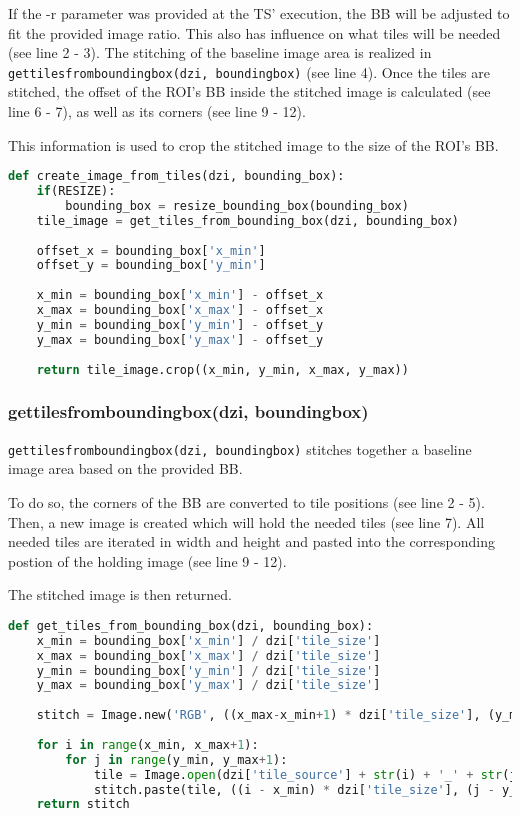 If the -r parameter was provided at the TS' execution, the BB will be adjusted to fit the provided image ratio. This also has influence on what tiles will be needed (see line 2 - 3). The stitching of the baseline image area is realized in \texttt{get{\textunderscore}tiles{\textunderscore}from{\textunderscore}bounding{\textunderscore}box(dzi, bounding{\textunderscore}box)} (see line 4). Once the tiles are stitched, the offset of the ROI's BB inside the stitched image is calculated (see line 6 - 7), as well as its corners (see line 9 - 12).

This information is used to crop the stitched image to the size of the ROI's BB.

\begin{lstlisting}[frame=single,language=python]
def create_image_from_tiles(dzi, bounding_box):
	if(RESIZE):
		bounding_box = resize_bounding_box(bounding_box)
	tile_image = get_tiles_from_bounding_box(dzi, bounding_box)
	
	offset_x = bounding_box['x_min']
	offset_y = bounding_box['y_min']
	
	x_min = bounding_box['x_min'] - offset_x
	x_max = bounding_box['x_max'] - offset_x
	y_min = bounding_box['y_min'] - offset_y
	y_max = bounding_box['y_max'] - offset_y
	
	return tile_image.crop((x_min, y_min, x_max, y_max))
\end{lstlisting}


\subsubsection{get{\textunderscore}tiles{\textunderscore}from{\textunderscore}bounding{\textunderscore}box(dzi, bounding{\textunderscore}box)}

\texttt{get{\textunderscore}tiles{\textunderscore}from{\textunderscore}bounding{\textunderscore}box(dzi, bounding{\textunderscore}box)} stitches together a baseline image area  based on the provided BB.

To do so, the corners of the BB are converted to tile positions (see line 2 - 5). Then, a new image is created which will hold the needed tiles (see line 7). All needed tiles are iterated in width and height and pasted into the corresponding postion of the holding image (see line 9 - 12).

The stitched image is then returned.

\begin{lstlisting}[frame=single,language=python]
def get_tiles_from_bounding_box(dzi, bounding_box):
	x_min = bounding_box['x_min'] / dzi['tile_size']
	x_max = bounding_box['x_max'] / dzi['tile_size']
	y_min = bounding_box['y_min'] / dzi['tile_size']
	y_max = bounding_box['y_max'] / dzi['tile_size']
	
	stitch = Image.new('RGB', ((x_max-x_min+1) * dzi['tile_size'], (y_max-y_min+1) * dzi['tile_size']))
	
	for i in range(x_min, x_max+1):
		for j in range(y_min, y_max+1):
			tile = Image.open(dzi['tile_source'] + str(i) + '_' + str(j) + '.' + dzi['format'])
			stitch.paste(tile, ((i - x_min) * dzi['tile_size'], (j - y_min) * dzi['tile_size']))
	return stitch
\end{lstlisting}


